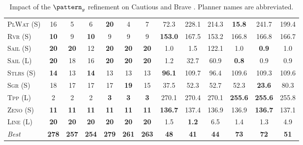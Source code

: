 \begin{table}[tb]
{\begin{tabular}{|l||cccccc||cccccc||}
\textsc{PlWat} (S)&16&5&6&\textbf{20}&4&7&72.3&228.1&214.3&\textbf{15.8}&241.7&199.4\\
\textsc{Rvr} (S)&\textbf{10}&9&\textbf{10}&9&9&9&\textbf{153.0}&167.5&153.2&166.8&166.8&166.7\\
\textsc{Sail} (S)&\textbf{20}&\textbf{20}&12&\textbf{20}&\textbf{20}&\textbf{20}&1.0&1.5&122.1&1.0&\textbf{0.9}&1.0\\
\textsc{Sail} (L)&\textbf{20}&18&16&\textbf{20}&\textbf{20}&\textbf{20}&1.2&32.7&60.9&\textbf{0.8}&0.9&0.9\\
\textsc{Stlrs} (S)&\textbf{14}&13&\textbf{14}&13&13&13&\textbf{96.1}&109.7&96.4&109.6&109.3&109.6\\
\textsc{Sgr} (S)&18&17&17&17&\textbf{19}&15&37.5&52.3&52.7&52.3&\textbf{23.6}&80.3\\
\textsc{Tpp} (L)&2&2&2&\textbf{3}&\textbf{3}&\textbf{3}&270.1&270.4&270.1&\textbf{255.6}&\textbf{255.6}&255.8\\
\textsc{Zeno} (S)&\textbf{11}&\textbf{11}&\textbf{11}&\textbf{11}&\textbf{11}&\textbf{11}&\textbf{136.7}&137.4&136.9&136.9&\textbf{136.7}&137.1\\
\textsc{Line} (L)&\textbf{20}&\textbf{20}&\textbf{20}&\textbf{20}&\textbf{20}&\textbf{20}&1.5&\textbf{1.2}&6.5&1.4&1.3&4.9
\\\hline
\textit{Best}&\textbf{278}&\textbf{257}&\textbf{254}&\textbf{279}&\textbf{261}&\textbf{263}&\textbf{48}&\textbf{41}&\textbf{44}&\textbf{73}&\textbf{72}&\textbf{51}\\\hline

        \end{tabular}}
        \caption{Impact of the $\pattern_g$ refinement on Cautious and Brave \pattyd. Planner names are abbreviated.}
        \label{tab:abl-patterng}
        \end{table}
        
